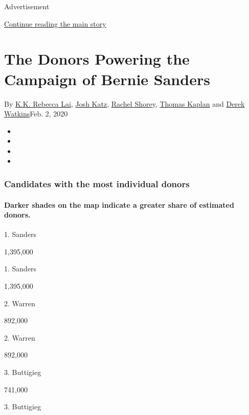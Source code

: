 Advertisement

\protect\hyperlink{after-top}{Continue reading the main story}

\hypertarget{the-donors-powering-the-campaign-of-bernie-sanders}{%
\section{The Donors Powering the Campaign of Bernie
Sanders}\label{the-donors-powering-the-campaign-of-bernie-sanders}}

By \href{https://www.nytimes.com/by/kk-rebecca-lai}{K.K. Rebecca Lai},
\href{https://www.nytimes.com/by/josh-katz}{Josh Katz},
\href{https://www.nytimes.com/by/rachel-shorey}{Rachel Shorey},
\href{https://www.nytimes.com/by/thomas-kaplan}{Thomas Kaplan} and
\href{https://www.nytimes.com/by/derek-watkins}{Derek Watkins}Feb. 2,
2020

\begin{itemize}
\item
\item
\item
\item
\end{itemize}

\hypertarget{candidates-with-the-most-individual-donors}{%
\subsubsection{Candidates with the most individual
donors}\label{candidates-with-the-most-individual-donors}}

\hypertarget{darker-shades-on-the-map-indicate-a-greater-share-of-estimated-donors}{%
\paragraph{Darker shades on the map indicate a greater share of
estimated
donors.}\label{darker-shades-on-the-map-indicate-a-greater-share-of-estimated-donors}}

1. Sanders

1,395,000

1. Sanders

1,395,000

2. Warren

892,000

2. Warren

892,000

3. Buttigieg

741,000

3. Buttigieg

